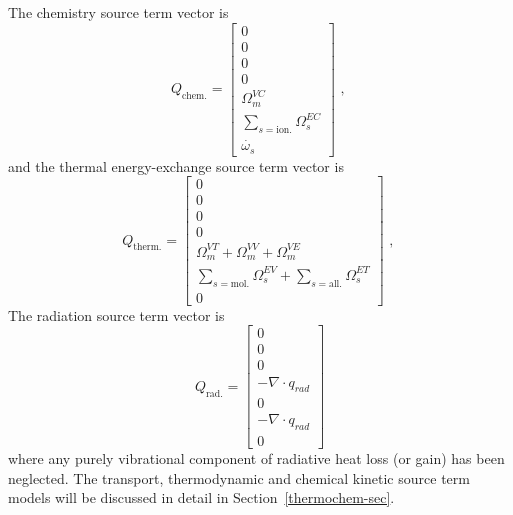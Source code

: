 \medskip
The chemistry source term vector is
\begin{equation}
 Q_{\text{chem.}} = \left [ \begin{array}{c} 0 \\ 0 \\ 0 \\ 0 \\ \Omega^{VC}_{m} \\ \sum_{s=\text{ion.}} \Omega^{EC}_{s} \\ \dot{\omega_{s}} \end{array} \right ] \text{ , }
 \label{eq:Q_chem}
\end{equation}
and the thermal energy-exchange source term vector is
\begin{equation}
 Q_{\text{therm.}} = \left [ \begin{array}{c} 0 \\ 0 \\ 0 \\ 0 \\ \Omega^{VT}_{m} + \Omega^{VV}_{m} + \Omega^{VE}_{m} \\ \sum_{s=\text{mol.}}\Omega^{EV}_{s} +  \sum_{s=\text{all.}}\Omega^{ET}_{s} \\ 0 \end{array} \right ] \text{ , }
 \label{eq:Q_therm}
\end{equation}
The radiation source term vector is
\begin{equation}
 Q_{\text{rad.}} = \left [ \begin{array}{c} 0 \\ 0 \\ 0 \\ -\nabla \cdot q_{rad} \\ 0 \\ -\nabla \cdot q_{rad} \\ 0 \end{array} \right ]
 \label{eq:Q_rad}
\end{equation}
where any purely vibrational component of radiative heat loss (or gain) has been neglected.
The transport, thermodynamic and chemical kinetic source term models 
will be discussed in detail in Section~\ref{thermochem-sec}.


